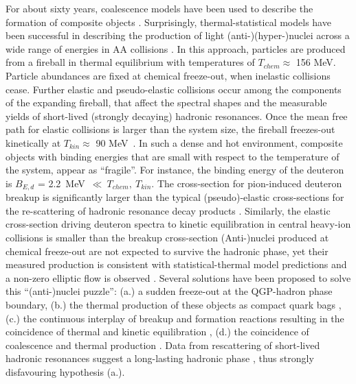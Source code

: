\documentclass[%
 reprint,
 amsmath,amssymb,
 aps,
]{revtex4-1}
\begin{document}
For about sixty years, coalescence models have been used to describe the formation of composite objects \cite{Butler:1963, Kapusta:1980, Sato:1981ez, Nagle:1996vp, Scheibl:1998tk, Cho:2017dcy, Blum:2017qnn, Bazak:2018hgl, Zhao:2018lyf}.
Surprisingly, thermal-statistical models have been successful in describing the production of light \mbox{(anti-)}(hyper-)nuclei across a wide range of energies in AA collisions \cite{Andronic:2010qu,Andronic:2017}. 
In this approach, particles are produced from a fireball in thermal equilibrium with temperatures of $T_{chem} \approx$ 156 MeV.
Particle abundances are fixed at chemical freeze-out, when inelastic collisions cease. Further elastic and pseudo-elastic collisions occur among the components of the expanding fireball, that affect the spectral shapes and the measurable yields of short-lived (strongly decaying) hadronic resonances. 
Once the mean free path for elastic collisions is larger than the system size, the fireball freezes-out kinetically at $T_{kin} \approx$ 90 MeV~\cite{Abelev:2013vea}. 
In such a dense and hot environment, composite objects with binding energies that are small with respect to the temperature of the system, appear as ``fragile''. 
For instance, the binding energy of the deuteron is $B_{E, d}$ = 2.2~MeV~$\ll~T_{chem},~T_{kin}$.
The cross-section for pion-induced deuteron breakup is significantly larger than the typical (pseudo)-elastic cross-sections for the re-scattering of hadronic resonance decay products \cite{Garcilazo:1982yc, Bass:1998ca, Schukraft:2017nbn, Oliinychenko:2018ugs}. 
Similarly, the elastic cross-section driving deuteron spectra to kinetic equilibration in central heavy-ion collisions \cite{Acharya:2017dmc} is smaller than the breakup cross-section \cite{Garcilazo:1982yc, Bass:1998ca, Schukraft:2017nbn, Oliinychenko:2018ugs}   
(Anti-)nuclei produced at chemical freeze-out are not expected to survive the hadronic phase, yet their measured production is consistent with statistical-thermal model predictions and a non-zero elliptic flow is observed \cite{Acharya:2017dmc, Puccio:2019oyd}. 
Several solutions have been proposed to solve this ``(anti-)nuclei puzzle'': (a.) a sudden freeze-out at the QGP-hadron phase boundary, (b.) the thermal production of these objects as compact quark bags \cite{Andronic:2017}, (c.) the continuous interplay of breakup and formation reactions resulting in the coincidence of thermal and kinetic equilibration \cite{Oliinychenko:2018ugs, Xu:2018jff}, (d.) the coincidence of coalescence and thermal production \cite{Scheibl:1998tk, HeinzTorino}.
Data from rescattering of short-lived hadronic resonances suggest a long-lasting hadronic phase \cite{Abelev:2014uua}, thus strongly disfavouring hypothesis (a.). 
\end{document}
